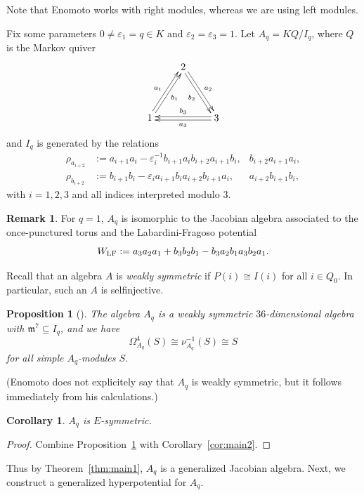 \documentclass[12pt,reqno]{amsart}
\newtheorem{Cor}[Thm]{Corollary}
\newtheorem{Prop}[Thm]{Proposition}
\theoremstyle{definition}
\newtheorem{Rem}[Thm]{Remark}
\newcommand{\m}{\mathfrak{m}}
\begin{document}
Note that Enomoto works with right modules, whereas we are using left modules.

Fix some parameters $0 \not= \varepsilon_1 = q \in K$ and
$\varepsilon_2 = \varepsilon_3 = 1$.
Let $A_q = KQ/I_q$, where $Q$ is the Markov quiver
\[
\xymatrix@C=8mm@R=14mm{
& 2 \ar@<0.4ex>[dr]^{a_2}\ar@<-0.4ex>[dr]_{b_2}
\\
1 \ar@<0.4ex>[ur]^{a_1}\ar@<-0.4ex>[ur]_{b_1}
&& 3 \ar@<0.4ex>[ll]^{a_3}\ar@<-0.4ex>[ll]_{b_3}
}
\]
and $I_q$ is generated by the relations
\begin{align*}
\rho_{a_{i+2}} &:= 
a_{i+1}a_i - \varepsilon_i^{-1}b_{i+1}a_ib_{i+2}a_{i+1}b_i,
&b_{i+2}a_{i+1}a_i,
\\
\rho_{b_{i+2}} &:= b_{i+1}b_i - \varepsilon_i a_{i+1}b_ia_{i+2}b_{i+1}a_i,
&
a_{i+2}b_{i+1}b_i,
\end{align*}
with $i = 1,2,3$ and all indices interpreted modulo $3$.

\begin{Rem}
For $q =1$, $A_q$ is isomorphic to the Jacobian algebra associated to the once-punctured torus and the Labardini-Fragoso potential
$$
W_{\rm LF} := a_3a_2a_1 + b_3b_2b_1 - b_3a_2b_1a_3b_2a_1.
$$
\end{Rem}

Recall that an algebra $A$ is \emph{weakly symmetric} if
$P(i) \cong I(i)$ for all $i \in Q_0$.
In particular, such an $A$ is selfinjective.

\begin{Prop}[{\cite[Propositions~2.1 and 3.1]{E26}}]
\label{prop:eno1}
The algebra $A_q$ is a weakly symmetric $36$-dimensional
algebra with $\m^7 \subseteq I_q$, and we have
$$
\Omega_{A_q}^4(S) \cong \nu_{A_q}^{-1}(S) \cong S
$$
for all simple $A_q$-modules $S$.
\end{Prop}

(Enomoto does not explicitely say that $A_q$ is weakly symmetric, but it follows immediately from his calculations.)

\begin{Cor}
$A_q$ is $E$-symmetric.
\end{Cor}

\begin{proof}
Combine 
Proposition~\ref{prop:eno1} with
Corollary~\ref{cor:main2}.
\end{proof}

Thus by Theorem~\ref{thm:main1}, $A_q$ is a generalized Jacobian algebra.
Next, we construct a generalized hyperpotential for
$A_q$.
\end{document}
